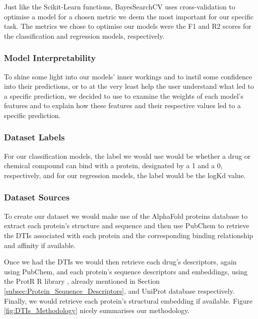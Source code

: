 Just like the Scikit-Learn functions, BayesSearchCV uses cross-validation to optimise a model for a chosen metric we deem the most important for our specific task. The metrics we chose to optimise our models were the F1 and R2 scores for the classification and regression models, respectively.
 
\subsubsection{Model Interpretability}
\label{subsubsec:Interpretability}

To shine some light into our models' inner workings and to instil some confidence into their predictions, or to at the very least help the user understand what led to a specific prediction, we decided to use \citet{ELI5} to examine the weights of each model's features and \citet{LIME} to explain how these features and their respective values led to a specific prediction.

\subsubsection{Dataset Labels}

For our classification models, the label we would use would be whether a drug or chemical compound can bind with a protein, designated by a 1 and a 0, respectively, and for our regression models, the label would be the logKd value.

\subsubsection{Dataset Sources}

To create our dataset we would make use of the AlphaFold proteins database \citep{Jumper2021, Varadi2022} to extract each protein's structure and sequence and then use PubChem \citep{PubChem} to retrieve the DTIs associated with each protein and the corresponding binding relationship and affinity if available.

Once we had the DTIs we would then retrieve each drug's descriptors, again using PubChem, and each 
protein's sequence descriptors and embeddings, using the ProtR R library \citep{ProtR_Paper}, already mentioned in Section \ref{subsec:Protein_Sequence_Descriptors}, and UniProt database \citep{UniProt_Paper} respectively. Finally, we would retrieve each protein's structural embedding if available. Figure \ref{fig:DTIs_Methodology} nicely summarises our methodology.


